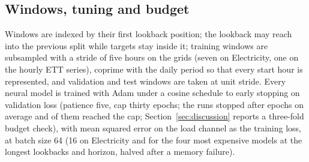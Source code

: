 \subsection{Windows, tuning and budget}
Windows are indexed by their first lookback position; the lookback may reach into the previous
split while targets stay inside it; training windows are subsampled with a stride of five
hours on the grids (seven on Electricity, one on the hourly ETT series), coprime with the
daily period so that every start hour is represented, and validation and test windows are
taken at unit stride. Every neural model is trained with Adam under a cosine schedule to early
stopping on validation loss (patience five, cap thirty epochs; the runs stopped after
 epochs on average and  of them reached the
cap; Section~\ref{sec:discussion} reports a three-fold budget check), with mean squared error
on the load channel as the training loss, at batch size 64 (16 on Electricity and for
the four most expensive models at the longest lookbacks and horizon, halved after a memory
failure).

